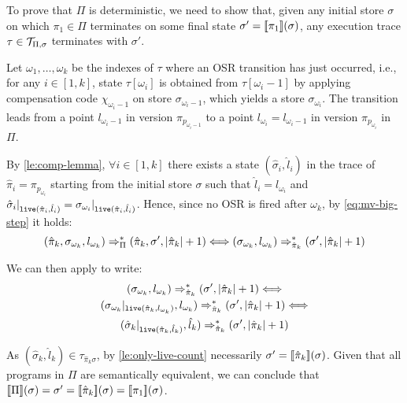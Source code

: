 \begin{myproof}
To prove that $\Pi$ is deterministic, we need to show that, given any initial store $\sigma$ on which $\pi_1\in\Pi$ terminates on some final state $\sigma'=[\![\pi_1]\!](\sigma)$, any execution trace $\tau\in{\cal T}_{\Pi,\sigma}$ terminates with $\sigma'$.

\noindent Let $\omega_1,\ldots,\omega_k$ be the indexes of $\tau$ where an OSR transition has just occurred, i.e., for any $i\in[1,k]$, state $\tau[\omega_i]$ is obtained from $\tau[\omega_i-1]$ by applying compensation code $\chi_{\omega_i-1}$ on store $\sigma_{\omega_i-1}$, which yields a store $\sigma_{\omega_i}$. The transition leads from a point $l_{\omega_i-1}$ in version $\pi_{p_{\omega_i-1}}$ to a point $l_{\omega_i}=l_{\omega_i-1}$ in version $\pi_{p_{\omega_{i}}}$ in $\Pi$. 

By \mylemma\ref{le:comp-lemma}, $\forall i\in[1,k]$ there exists a state $(\hat{\sigma}_i,\hat{l}_i)$ in the trace of $\hat{\pi}_i=\pi_{p_{\omega_{i}}}$ starting from the initial store $\sigma$ such that $\hat{l}_i=l_{\omega_i}$ and $\hat{\sigma}_i\vert_{\text{${\tt live}$}(\hat{\pi}_i,\hat{l}_i)}=\sigma_{\omega_i}\vert_{\text{${\tt live}$}(\hat{\pi}_i,\hat{l}_i)}$. Hence, since no OSR is fired after $\omega_k$, by \myequation\ref{eq:mv-big-step} it holds: 
\begin{equation*}
(\hat{\pi}_k,\sigma_{\omega_{k}},l_{\omega_{k}})\Rightarrow^*_{\Pi}(\hat{\pi}_k,\sigma',|\hat{\pi}_k|+1) \Longleftrightarrow (\sigma_{\omega_{k}},l_{\omega_{k}})\Rightarrow^*_{\hat{\pi}_k}(\sigma',|\hat{\pi}_k|+1)
\end{equation*}

\noindent We can then apply  to write:
\begin{gather*}
(\sigma_{\omega_{k}},l_{\omega_{k}})\Rightarrow^*_{\hat{\pi}_k}(\sigma',|\hat{\pi}_k|+1) \Longleftrightarrow \\ 
(\sigma_{\omega_{k}}\vert_{\text{${\tt live}$}(\hat{\pi}_k,l_{\omega_{k}})},l_{\omega_{k}})\Rightarrow^*_{\hat{\pi}_k}(\sigma',|\hat{\pi}_k|+1) \Longleftrightarrow \\
(\hat{\sigma}_k\vert_{\text{${\tt live}$}(\hat{\pi}_k,\hat{l}_k)},\hat{l}_k)\Rightarrow^*_{\hat{\pi}_k}(\sigma',|\hat{\pi}_k|+1)
\end{gather*}

\noindent As $(\hat{\sigma}_k,\hat{l}_k)\in\tau_{\hat{\pi}_k\sigma}$, by \ref{le:only-live-count} necessarily $\sigma'=[\![\hat{\pi}_k]\!](\sigma)$. 
Given that all programs in $\Pi$ are semantically equivalent, we can conclude that $[\![\Pi]\!](\sigma)=\sigma'=[\![\hat{\pi}_k]\!](\sigma)=[\![\pi_1]\!](\sigma)$.
\end{myproof}


